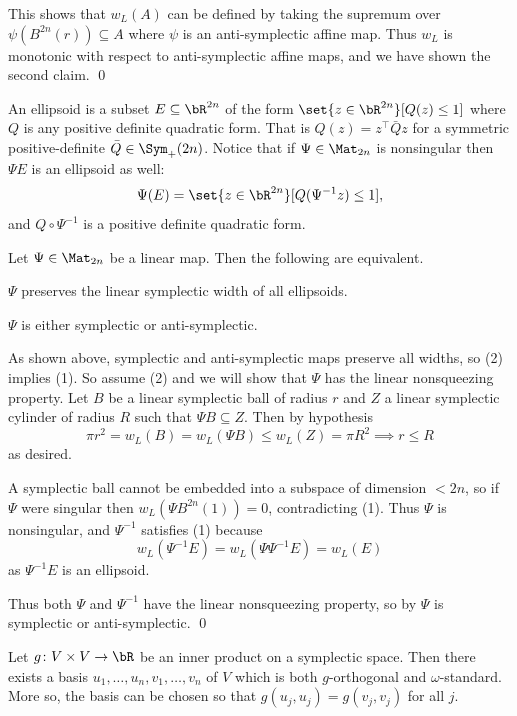    This shows that $w_L(A)$ can be defined by taking the supremum over $\psi(B^{2n}(r))\subseteq A$ where $\psi$ is an anti-symplectic affine map.
    Thus $w_L$ is monotonic with respect to anti-symplectic affine maps, and we have shown the second claim.
    \qed

\eproof

An {\emphcolor ellipsoid} is a subset $E\subseteq\bR^{2n}$ of the form $\set{z\in\bR^{2n}}[Q(z)\leq1]$ where $Q$ is any positive definite quadratic form.
That is $Q(z)=z^\top\bar Qz$ for a symmetric positive-definite $\bar Q\in\Sym_+(2n)$.
Notice that if $\Psi\in\Mat_{2n}$ is nonsingular then $\Psi E$ is an ellipsoid as well:
$$ \Psi(E) = \set{z\in\bR^{2n}}[Q(\Psi^{-1}z)\leq1] , $$
and $Q\circ\Psi^{-1}$ is a positive definite quadratic form.

\bthrm

    Let $\Psi\in\Mat_{2n}$ be a linear map.
    Then the following are equivalent.
    \benum
        \item $\Psi$ preserves the linear symplectic width of all ellipsoids.
        \item $\Psi$ is either symplectic or anti-symplectic.
    \eenum

\ethrm

\bproof

    As shown above, symplectic and anti-symplectic maps preserve all widths, so (2) implies (1).
    So assume (2) and we will show that $\Psi$ has the linear nonsqueezing property.
    Let $B$ be a linear symplectic ball of radius $r$ and $Z$ a linear symplectic cylinder of radius $R$ such that $\Psi B\subseteq Z$.
    Then by hypothesis
    $$ \pi r^2 = w_L(B) = w_L(\Psi B) \leq w_L(Z) = \pi R^2 \implies r\leq R $$
    as desired.

    A symplectic ball cannot be embedded into a subspace of dimension $<2n$, so if $\Psi$ were singular then $w_L(\Psi B^{2n}(1))=0$, contradicting (1).
    Thus $\Psi$ is nonsingular, and $\Psi^{-1}$ satisfies (1) because 
    $$ w_L(\Psi^{-1}E) = w_L(\Psi\Psi^{-1}E) = w_L(E) $$
    as $\Psi^{-1}E$ is an ellipsoid.

    Thus both $\Psi$ and $\Psi^{-1}$ have the linear nonsqueezing property, so by  $\Psi$ is symplectic or anti-symplectic.
    \qed

\eproof

\blemm

    Let $g\colon V\times V\to\bR$ be an inner product on a symplectic space.
    Then there exists a basis $u_1,\dots,u_n,v_1,\dots,v_n$ of $V$ which is both $g$-orthogonal and $\omega$-standard.
    More so, the basis can be chosen so that $g(u_j,u_j) = g(v_j,v_j)$ for all $j$.

